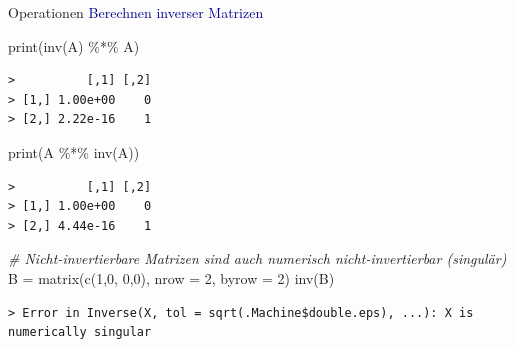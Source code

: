\documentclass[
  8pt,
  ignorenonframetext,
]{beamer}
\newenvironment{Shaded}{\begin{snugshade}}{\end{snugshade}}
\newcommand{\AttributeTok}[1]{\textcolor[rgb]{0.77,0.63,0.00}{#1}}
\newcommand{\CommentTok}[1]{\textcolor[rgb]{0.56,0.35,0.01}{\textit{#1}}}
\newcommand{\DecValTok}[1]{\textcolor[rgb]{0.00,0.00,0.81}{#1}}
\newcommand{\FunctionTok}[1]{\textcolor[rgb]{0.00,0.00,0.00}{#1}}
\newcommand{\NormalTok}[1]{#1}
\newcommand{\OtherTok}[1]{\textcolor[rgb]{0.56,0.35,0.01}{#1}}
\newcommand{\SpecialCharTok}[1]{\textcolor[rgb]{0.00,0.00,0.00}{#1}}
\begin{document}
\begin{frame}[fragile]{Operationen}
\protect\hypertarget{operationen-28}{}
\textcolor{darkblue}{Berechnen inverser Matrizen} \footnotesize
\vspace{2mm} 

\begin{Shaded}
\begin{Highlighting}[]
\FunctionTok{print}\NormalTok{(}\FunctionTok{inv}\NormalTok{(A) }\SpecialCharTok{\%*\%}\NormalTok{ A)}
\end{Highlighting}
\end{Shaded}

\begin{verbatim}
>          [,1] [,2]
> [1,] 1.00e+00    0
> [2,] 2.22e-16    1
\end{verbatim}

\vspace{2mm}

\begin{Shaded}
\begin{Highlighting}[]
\FunctionTok{print}\NormalTok{(A }\SpecialCharTok{\%*\%} \FunctionTok{inv}\NormalTok{(A))}
\end{Highlighting}
\end{Shaded}

\begin{verbatim}
>          [,1] [,2]
> [1,] 1.00e+00    0
> [2,] 4.44e-16    1
\end{verbatim}

\vspace{2mm}

\begin{Shaded}
\begin{Highlighting}[]
\CommentTok{\# Nicht{-}invertierbare Matrizen sind auch numerisch nicht{-}invertierbar (singulär)}
\NormalTok{B }\OtherTok{=} \FunctionTok{matrix}\NormalTok{(}\FunctionTok{c}\NormalTok{(}\DecValTok{1}\NormalTok{,}\DecValTok{0}\NormalTok{,}
             \DecValTok{0}\NormalTok{,}\DecValTok{0}\NormalTok{),}
           \AttributeTok{nrow  =} \DecValTok{2}\NormalTok{,}
           \AttributeTok{byrow =} \DecValTok{2}\NormalTok{)}
\FunctionTok{inv}\NormalTok{(B)}
\end{Highlighting}
\end{Shaded}

\begin{verbatim}
> Error in Inverse(X, tol = sqrt(.Machine$double.eps), ...): X is numerically singular
\end{verbatim}
\end{frame}
\end{document}
